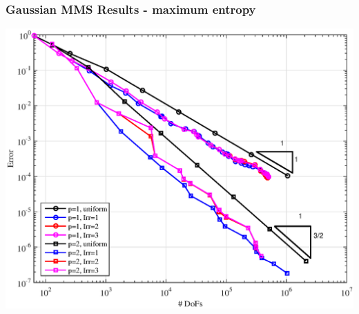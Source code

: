 \documentclass[compress,10pt]{beamer}
\begin{document}
\begin{frame}[t]
{}
{
\frametitle{Gaussian MMS Results - maximum entropy}
\hspace*{1.25cm}
{}\includegraphics[width=0.75\columnwidth]{images/TransportMMS_Gauss2D_MAXENT_Err.eps}
}
\end{frame}
\end{document}
